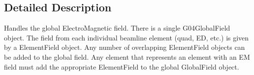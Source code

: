 \subsection{Detailed Description}
Handles the global Electro\-Magnetic field. There is a single G04\-Global\-Field object. The field from each individual beamline element (quad, E\-D, etc.) is given by a Element\-Field object. Any number of overlapping Element\-Field objects can be added to the global field. Any element that represents an element with an E\-M field must add the appropriate Element\-Field to the global Global\-Field object. 
